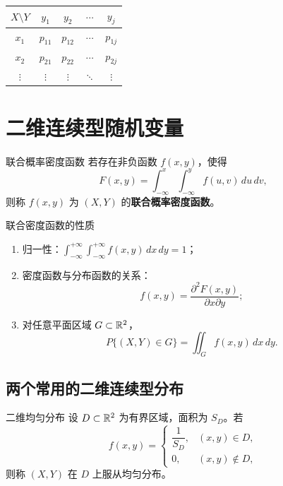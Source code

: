 \begin{center}
\begin{tabular}{c|cccc}
\toprule
$X \setminus Y$ & $y_1$     & $y_2$     & $\cdots$  & $y_j$     \\
\midrule
$x_1$ & $p_{11}$ & $p_{12}$ & $\cdots$ & $p_{1j}$ \\
$x_2$ & $p_{21}$ & $p_{22}$ & $\cdots$ & $p_{2j}$ \\
$\vdots$ & $\vdots$ & $\vdots$ & $\ddots$ & $\vdots$ \\
\bottomrule
\end{tabular}
\end{center}

\section{二维连续型随机变量}

\begin{mydefinition}{联合概率密度函数}
	若存在非负函数 $f(x, y)$，使得
	\[F(x, y) = \int_{-\infty}^{x} \int_{-\infty}^{y} f(u, v)\,du\,dv,\]
	则称 $f(x, y)$ 为 $(X, Y)$ 的\textbf{联合概率密度函数}。
\end{mydefinition}

\begin{myproperty}{联合密度函数的性质}
\begin{enumerate}
	\item 归一性：$\displaystyle\int_{-\infty}^{+\infty} \int_{-\infty}^{+\infty} f(x, y)\,dx\,dy = 1$；
	\item 密度函数与分布函数的关系：
	\[f(x, y) = \frac{\partial^2 F(x, y)}{\partial x \partial y};\]
	\item 对任意平面区域 $G \subset \mathbb{R}^2$，
	\[P\{(X, Y) \in G\} = \iint_G f(x, y)\,dx\,dy.\]
\end{enumerate}
\end{myproperty}

\subsection{两个常用的二维连续型分布}

\begin{mydefinition}{二维均匀分布}
	设 $D \subset \mathbb{R}^2$ 为有界区域，面积为 $S_D$。若
	\[f(x, y) = \begin{cases}
	\dfrac{1}{S_D}, & (x, y) \in D, \\[8pt]
	0, & (x, y) \notin D,
	\end{cases}\]
	则称 $(X, Y)$ 在 $D$ 上服从均匀分布。
\end{mydefinition}


